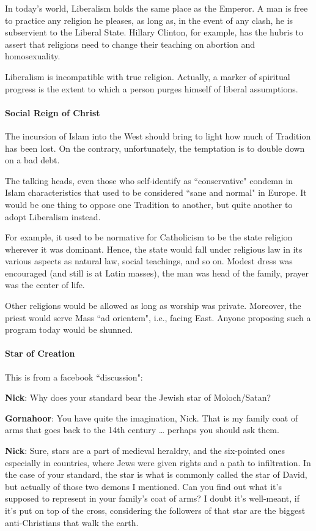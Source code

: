 In today's world, Liberalism holds the same place as the Emperor. A man is free to practice any religion he pleases, as long as, in the event of any clash, he is subservient to the Liberal State. Hillary Clinton, for example, has the hubris to assert that religions need to change their teaching on abortion and homosexuality.

Liberalism is incompatible with true religion. Actually, a marker of spiritual progress is the extent to which a person purges himself of liberal assumptions.

\paragraph{Social Reign of Christ}
The incursion of Islam into the West should bring to light how much of Tradition has been lost. On the contrary, unfortunately, the temptation is to double down on a bad debt.

The talking heads, even those who self-identify as ``conservative" condemn in Islam characteristics that used to be considered ``sane and normal" in Europe. It would be one thing to oppose one Tradition to another, but quite another to adopt Liberalism instead.

For example, it used to be normative for Catholicism to be the state religion wherever it was dominant. Hence, the state would fall under religious law in its various aspects as natural law, social teachings, and so on. Modest dress was encouraged (and still is at Latin masses), the man was head of the family, prayer was the center of life.

Other religions would be allowed as long as worship was private. Moreover, the priest would serve Mass ``ad orientem", i.e., facing East. Anyone proposing such a program today would be shunned.

\paragraph{Star of Creation}
This is from a facebook ``discussion":

\begin{quotex}
\textbf{Nick}: Why does your standard bear the Jewish star of Moloch/Satan?

\textbf{Gornahoor}: You have quite the imagination, Nick. That is my family coat of arms that goes back to the 14th century … perhaps you should ask them.

\textbf{Nick}: Sure, stars are a part of medieval heraldry, and the six-pointed ones especially in countries, where Jews were given rights and a path to infiltration. In the case of your standard, the star is what is commonly called the star of David, but actually of those two demons I mentioned. Can you find out what it's supposed to represent in your family's coat of arms? I doubt it's well-meant, if it's put on top of the cross, considering the followers of that star are the biggest anti-Christians that walk the earth. 

\end{quotex}

